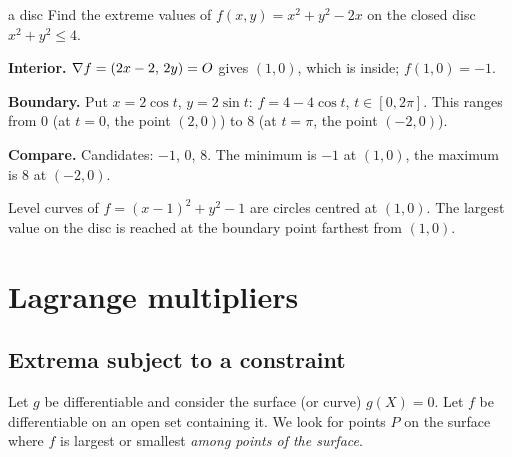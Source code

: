 \begin{example}{a disc}
Find the extreme values of $f(x,y)=x^2+y^2-2x$ on the closed disc $x^2+y^2\le4$.

\textbf{Interior.} $\nabla f=(2x-2,\,2y)=O$ gives $(1,0)$, which is inside; $f(1,0)=-1$.

\textbf{Boundary.} Put $x=2\cos t$, $y=2\sin t$: $f=4-4\cos t$, $t\in[0,2\pi]$. This ranges from
$0$ (at $t=0$, the point $(2,0)$) to $8$ (at $t=\pi$, the point $(-2,0)$).

\textbf{Compare.} Candidates: $-1$, $0$, $8$. The minimum is $-1$ at $(1,0)$, the maximum is
$8$ at $(-2,0)$.
\end{example}

\begin{center}

{\small\color{navy} Level curves of $f=(x-1)^2+y^2-1$ are circles centred at $(1,0)$. The
largest value on the disc is reached at the boundary point farthest from $(1,0)$.}
\end{center}

\section{Lagrange multipliers}

\subsection{Extrema subject to a constraint}

Let $g$ be differentiable and consider the surface (or curve) $g(X)=0$. Let $f$ be
differentiable on an open set containing it. We look for points $P$ on the surface where $f$
is largest or smallest \emph{among points of the surface}.

